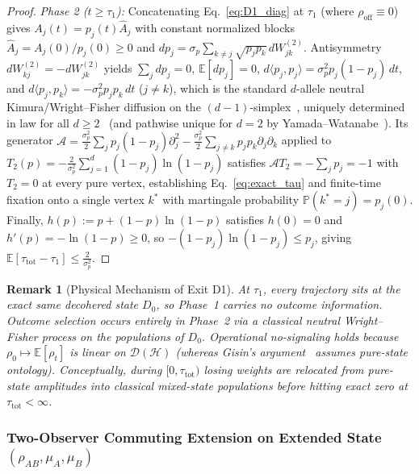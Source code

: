 \documentclass[aps,pra,10pt,twocolumn,superscriptaddress,amsmath,amssymb,floatfix]{revtex4-2}
\newtheorem{remark}{Remark}
\newcommand{\E}{\mathbb{E}}
\newcommand{\Prob}{\mathbb{P}}
\begin{document}
\begin{proof}
\emph{Phase 2 ($t \ge \tau_1$):} Concatenating Eq.~\eqref{eq:D1_diag} at $\tau_1$ (where $\rho_{\mathrm{off}}\equiv 0$) gives $A_j(t) = p_j(t)\hat{A}_j$ with constant normalized blocks $\hat{A}_j = A_j(0)/p_j(0) \ge 0$ and $dp_j = \sigma_p \sum_{k \ne j}\sqrt{p_j p_k}\,dW_{jk}^{(2)}$. Antisymmetry $dW_{kj}^{(2)} = -dW_{jk}^{(2)}$ yields $\sum_j dp_j = 0$, $\E[dp_j]=0$, $d\langle p_j,p_j\rangle = \sigma_p^2 p_j(1-p_j)\,dt$, and $d\langle p_j,p_k\rangle = -\sigma_p^2 p_j p_k\,dt$ ($j \ne k$), which is the standard $d$-allele neutral Kimura/Wright--Fisher diffusion on the $(d-1)$-simplex~\cite{Kimura1955,Littler1975,Baxter2007}, uniquely determined in law for all $d \ge 2$~\cite{Ethier1976} (and pathwise unique for $d=2$ by Yamada--Watanabe~\cite{YamadaWatanabe1971}). Its generator $\mathcal{A} = \frac{\sigma_p^2}{2}\sum_j p_j(1-p_j)\partial_j^2 - \frac{\sigma_p^2}{2}\sum_{j\ne k} p_j p_k \partial_j\partial_k$ applied to $T_2(p) = -\frac{2}{\sigma_p^2}\sum_{j=1}^d (1-p_j)\ln(1-p_j)$ satisfies $\mathcal{A} T_2 = -\sum_j p_j = -1$ with $T_2=0$ at every pure vertex, establishing Eq.~\eqref{eq:exact_tau} and finite-time fixation onto a single vertex $k^*$ with martingale probability $\Prob(k^*=j) = p_j(0)$. Finally, $h(p) := p + (1-p)\ln(1-p)$ satisfies $h(0)=0$ and $h'(p) = -\ln(1-p) \ge 0$, so $-(1-p_j)\ln(1-p_j) \le p_j$, giving $\E[\tau_{\mathrm{tot}}-\tau_1] \le \frac{2}{\sigma_p^2}$.
\end{proof}

\begin{remark}[Physical Mechanism of Exit D1]
At $\tau_1$, \emph{every} trajectory sits at the exact same decohered state $D_0$, so Phase~1 carries no outcome information. Outcome selection occurs entirely in Phase~2 via a classical neutral Wright--Fisher process on the populations of $D_0$. Operational no-signaling holds because $\rho_0 \mapsto \E[\rho_t]$ is linear on $\mathcal{D}(\mathcal{H})$ (whereas Gisin's argument~\cite{Gisin1989} assumes pure-state ontology). Conceptually, during $[0,\tau_{\mathrm{tot}})$ losing weights are relocated from pure-state amplitudes into classical mixed-state populations before hitting exact zero at $\tau_{\mathrm{tot}} < \infty$.
\end{remark}

\subsubsection{Two-Observer Commuting Extension on Extended State $(\rho_{AB},\mu_A,\mu_B)$}
\label{sec:two_obs}
\end{document}
